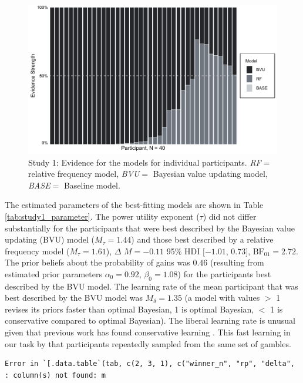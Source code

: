 \documentclass[
  a4paper, man, floatsintext]{apa6}
\begin{document}
\begin{figure}[htb]

{\centering \includegraphics[width=.9\linewidth]{../figures/fig2-1} 

}

\caption{Study 1: Evidence for the models for individual participants. \textit{RF}$=$ relative frequency model, \textit{BVU}$=$ Bayesian value updating model, \textit{BASE}$=$ Baseline model.}\label{fig:fig2}
\end{figure}

The estimated parameters of the best-fitting models are shown in Table
\ref{tab:study1_parameter}. The power utility exponent (\(\tau\)) did
not differ substantially for the participants that were best described
by the Bayesian value updating (BVU) model (\(M_{\tau}= 1.44\)) and
those best described by a relative frequency model (\(M_{\tau}=1.61\)),
\(\Delta\) \(M = -0.11\) 95\% HDI \([-1.01\), \(0.73]\),
\(\mathrm{BF}_{\textrm{01}} = 2.72\). The prior beliefs about the
probability of gains was \(0.46\) (resulting from estimated prior
parameters \(\alpha_0 = 0.92\), \(\beta_0 = 1.08\)) for the participants
best described by the BVU model. The learning rate of the mean
participant that was best described by the BVU model was
\(M_{\delta}=1.35\) (a model with values \(>\) 1 revises its priors
faster than optimal Bayesian, 1 is optimal Bayesian, \(<\) 1 is
conservative compared to optimal Bayesian). The liberal learning rate is
unusual given that previous work has found conservative learning
\citep{Edwards1967,Tauber2017}. This fast learning in our task
 by that participants repeatedly
sampled from the same set of gambles.

\begin{verbatim}
Error in `[.data.table`(tab, c(2, 3, 1), c("winner_n", "rp", "delta", : column(s) not found: m
\end{verbatim}
\end{document}
